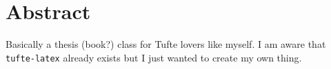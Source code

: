 \chapter{Abstract}
Basically a thesis (book?) class for Tufte lovers like myself.
I am aware that \texttt{tufte-latex} already exists but I just wanted to create my own thing.
